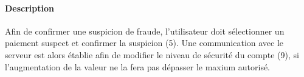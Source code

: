\paragraph{Description} Afin de confirmer une suspicion de fraude, l'utilisateur doit sélectionner un paiement suspect et confirmer la suspicion (5). Une communication avec le serveur est alors établie afin de modifier le niveau de sécurité du compte (9), si l'augmentation de la valeur ne la fera pas dépasser le maxium autorisé.